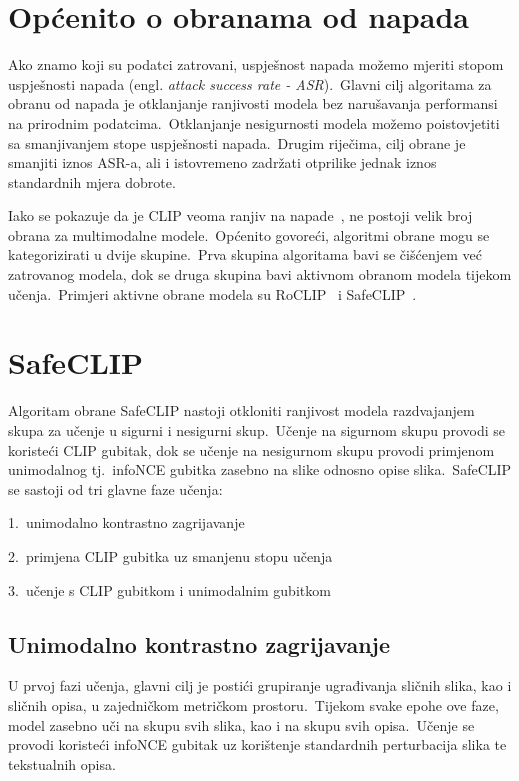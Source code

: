 \documentclass[times, utf8, seminar, numeric]{fer}
\begin{document}
\section{Općenito o obranama od napada}

Ako znamo koji su podatci zatrovani, uspješnost napada možemo mjeriti stopom uspješnosti napada (engl. \textit{attack success rate - ASR}).\ 
Glavni cilj algoritama za obranu od napada je otklanjanje ranjivosti modela bez narušavanja performansi na prirodnim podatcima.\ 
Otklanjanje nesigurnosti modela možemo poistovjetiti sa smanjivanjem stope uspješnosti napada.\ Drugim riječima, cilj obrane je smanjiti iznos ASR-a, ali i istovremeno zadržati otprilike jednak iznos standardnih mjera dobrote.\ 
  
Iako se pokazuje da je CLIP veoma ranjiv na napade~\cite{carlini2021poisoning}, ne postoji velik broj obrana za multimodalne modele.\ 
Općenito govoreći, algoritmi obrane mogu se kategorizirati u dvije skupine.\ 
Prva skupina algoritama bavi se čišćenjem već zatrovanog modela, dok se druga skupina bavi aktivnom obranom modela tijekom učenja.\ 
Primjeri aktivne obrane modela su RoCLIP~\cite{yang2023robust} i SafeCLIP~\cite{yang2023better}.\

\section{SafeCLIP}

Algoritam obrane SafeCLIP nastoji otkloniti ranjivost modela razdvajanjem skupa za učenje u sigurni i nesigurni skup.\ 
Učenje na sigurnom skupu provodi se koristeći CLIP gubitak, dok se učenje na nesigurnom skupu provodi primjenom unimodalnog tj.\ infoNCE gubitka zasebno na slike odnosno opise slika.\ 
SafeCLIP se sastoji od tri glavne faze učenja: 

1.\ unimodalno kontrastno zagrijavanje
  
2.\ primjena CLIP gubitka uz smanjenu stopu učenja   
  
3.\ učenje s CLIP gubitkom i unimodalnim gubitkom  

\pagebreak

\subsection{Unimodalno kontrastno zagrijavanje}

U prvoj fazi učenja, glavni cilj je postići grupiranje ugrađivanja sličnih slika, kao i sličnih opisa, u zajedničkom metričkom prostoru.\ 
Tijekom svake epohe ove faze, model zasebno uči na skupu svih slika, kao i na skupu svih opisa.\ 
Učenje se provodi koristeći infoNCE gubitak uz korištenje standardnih perturbacija slika te tekstualnih opisa.\  
  
\end{document}
